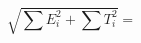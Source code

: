 \documentclass{minimal}
\begin{document}
\begin{equation}
\sqrt{\sum E_i^2 + \sum T_i^2} =
\end{equation}
\end{document}
